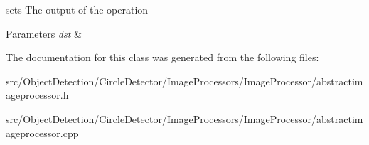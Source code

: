 sets The output of the operation 


\begin{DoxyParams}{Parameters}
{\em dst} & \\
\hline
\end{DoxyParams}


The documentation for this class was generated from the following files\+:\begin{DoxyCompactItemize}
\item 
src/\+Object\+Detection/\+Circle\+Detector/\+Image\+Processors/\+Image\+Processor/abstractimageprocessor.\+h\item 
src/\+Object\+Detection/\+Circle\+Detector/\+Image\+Processors/\+Image\+Processor/abstractimageprocessor.\+cpp\end{DoxyCompactItemize}
